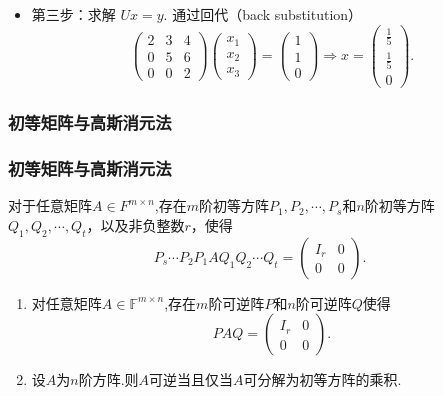 \begin{frame}
\begin{itemize}
\item 第三步：求解 $Ux = y$. 通过回代（back substitution）
\[\begin{pmatrix}
2 & 3 & 4 \\
0 & 5 & 6 \\
0 & 0 & 2
\end{pmatrix}
\begin{pmatrix}x_1 \\x_2 \\x_3\end{pmatrix}
=
\begin{pmatrix}1 \\1 \\0\end{pmatrix}
\Rightarrow x = \begin{pmatrix} \frac{1}{5} \\ \frac{1}{5} \\ 0 \end{pmatrix}.\]
\end{itemize}
\end{frame}




\subsubsection{初等矩阵与高斯消元法}
\begin{frame}\frametitle{初等矩阵与高斯消元法}
\begin{theorem}对于任意矩阵$A\in F^{m\times n}$,存在$m$阶初等方阵$P_1,P_2,\cdots,P_s$和$n$阶初等方阵$Q_1,Q_2,\cdots,Q_t$，以及非负整数$r$，使得
\[P_s\cdots P_2P_1AQ_1Q_2\cdots Q_t=\begin{pmatrix}I_r&0\\0&0\end{pmatrix}.\]
\end{theorem}
\pp
\begin{corollary}
\begin{enumerate}
\item 对任意矩阵$A\in \mathbb F^{m\times n}$,存在$m$阶可逆阵$P$和$n$阶可逆阵$Q$使得
\[PAQ=\begin{pmatrix}I_r&0\\0&0\end{pmatrix}.\]
\pp
\item 设$A$为$n$阶方阵.则$A$可逆当且仅当$A$可分解为初等方阵的乘积.
\end{enumerate}
\end{corollary}

\end{frame}










